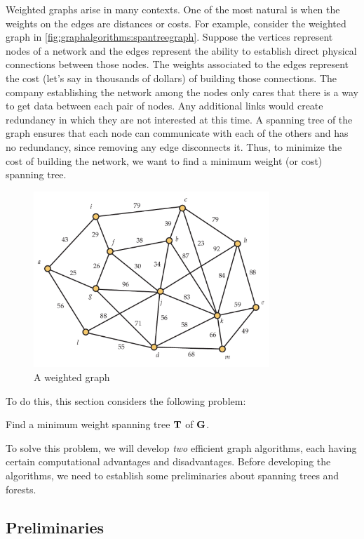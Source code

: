 Weighted graphs arise in many contexts. One of the most natural is
when the weights on the edges are distances or costs. For example,
consider the weighted graph in \autoref{fig:graphalgorithms:spantreegraph}. Suppose
the vertices represent nodes of a network and the edges represent the
ability to establish direct physical connections between those
nodes. The weights associated to the edges represent the cost (let's
say in thousands of dollars) of building those connections. The
company establishing the network among the nodes only cares that there
is a way to get data between each pair of nodes. Any additional links
would create redundancy in which they are not interested at this
time. A spanning tree of the graph ensures that each node can
communicate with each of the others and has no redundancy, since
removing any edge disconnects it. Thus, to minimize the cost of
building the network, we want to find a minimum weight (or cost)
spanning tree.
\begin{figure}
\begin{center}
\includegraphics[width=3.5in]{graphalgorithms-figs/spantreegraph}
\caption{\label{fig:graphalgorithms:spantreegraph}A weighted graph}
\end{center}
\end{figure}
To do this, this section considers the following problem:
\begin{problem*}
   Find a minimum weight spanning tree $\mathbf{T}$ of $\mathbf{G}$.
\end{problem*}
To solve this problem, we will develop \textit{two} efficient graph
algorithms, each having certain computational advantages and
disadvantages. Before developing the algorithms, we need to establish
some preliminaries about spanning trees and forests.

\subsection{Preliminaries}


